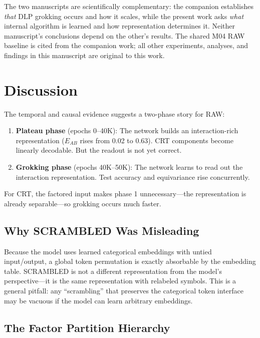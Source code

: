 \documentclass[11pt,a4paper]{article}
\theoremstyle{definition}
\theoremstyle{remark}
\newcommand{\EAB}{E_{AB}}
\begin{document}
The two manuscripts are scientifically complementary: the companion establishes \emph{that} DLP grokking occurs and how it scales, while the present work asks \emph{what} internal algorithm is learned and how representation determines it. Neither manuscript's conclusions depend on the other's results. The shared M04 RAW baseline is cited from the companion work; all other experiments, analyses, and findings in this manuscript are original to this work.


\section{Discussion}

The temporal and causal evidence suggests a two-phase story for RAW:
\begin{enumerate}[leftmargin=*]
    \item \textbf{Plateau phase} (epochs 0--40K): The network builds an interaction-rich representation ($\EAB$ rises from 0.02 to 0.63). CRT components become linearly decodable. But the readout is not yet correct.
    \item \textbf{Grokking phase} (epochs 40K--50K): The network learns to read out the interaction representation. Test accuracy and equivariance rise concurrently.
\end{enumerate}

For CRT, the factored input makes phase 1 unnecessary---the representation is already separable---so grokking occurs much faster.

\subsection{Why SCRAMBLED Was Misleading}

Because the model uses learned categorical embeddings with untied input/output, a global token permutation is exactly absorbable by the embedding table. SCRAMBLED is not a different representation from the model's perspective---it is the same representation with relabeled symbols. This is a general pitfall: any ``scrambling'' that preserves the categorical token interface may be vacuous if the model can learn arbitrary embeddings.

\subsection{The Factor Partition Hierarchy}
\end{document}
